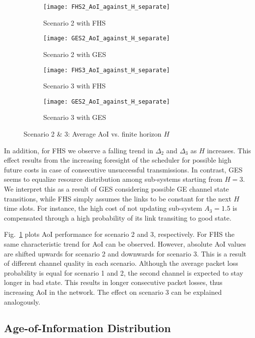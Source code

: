\begin{figure}[p]
  \centering
  \begin{subfigure}{0.49\textwidth}
    \centering
    \texttt{[image: FHS2\_AoI\_against\_H\_separate]}
    \caption{Scenario 2 with FHS}
  \end{subfigure}
  \hfill
  \begin{subfigure}{0.49\textwidth}
    \centering
    \texttt{[image: GES2\_AoI\_against\_H\_separate]}
    \caption{Scenario 2 with GES}
  \end{subfigure}
  \begin{subfigure}{0.49\textwidth}
    \centering
    \texttt{[image: FHS3\_AoI\_against\_H\_separate]}
    \caption{Scenario 3 with FHS}
  \end{subfigure}
  \hfill
  \begin{subfigure}{0.49\textwidth}
    \centering
    \texttt{[image: GES2\_AoI\_against\_H\_separate]}
    \caption{Scenario 3 with GES}
  \end{subfigure}
  \caption{Scenario 2 \& 3: Average AoI vs. finite horizon $H$}
  \label{fig:AoIseperate2}
\end{figure}

In addition, for FHS we observe a falling trend in $\Delta_2$ and $\Delta_3$ as
$H$ increases. This effect results from the increasing foresight of the
scheduler for possible high future costs in case of consecutive unsuccessful
transmissions. In contrast, GES seems to equalize resource distribution among
sub-systems starting from $H=3$. We interpret this as a result of GES
considering possible GE channel state transitions, while FHS simply assumes the
links to be constant for the next $H$ time slots. For instance, the high cost of
not updating sub-system $A_3=1.5$ is compensated through a high probability of
its link transiting to good state.

Fig.~\ref{fig:AoIseperate2} plots AoI performance for scenario 2 and 3,
respectively. For FHS the same characteristic trend for AoI can be observed.
However, absolute AoI values are shifted upwards for scenario 2 and downwards
for scenario 3. This is a result of different channel quality in each scenario.
Although the average packet loss probability is equal for scenario 1 and 2, the
second channel is expected to stay longer in bad state. This results in longer
consecutive packet losses, thus increasing AoI in the network. The effect on
scenario 3 can be explained analogously.

\subsection{Age-of-Information Distribution}

